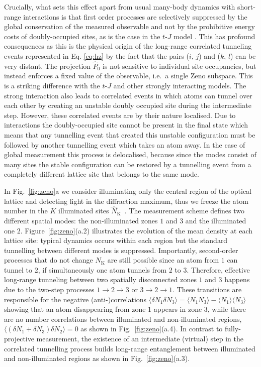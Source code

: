 Crucially, what sets this effect apart from usual many-body dynamics
with short-range interactions is that first order processes are
selectively suppressed by the global conservation of the measured
observable and not by the prohibitive energy costs of doubly-occupied
sites, as is the case in the $t$-$J$ model \cite{auerbach}. This has
profound consequences as this is the physical origin of the long-range
correlated tunneling events represented in Eq. \eqref{eq:hz} by the
fact that the pairs ($i$, $j$) and ($k$, $l$) can be very distant. The
projection $\hat{P}_0$ is not sensitive to individual site
occupancies, but instead enforces a fixed value of the observable,
i.e.~a single Zeno subspace. This is a striking difference with the
$t$-$J$ and other strongly interacting models. The strong interaction
also leads to correlated events in which atoms can tunnel over each
other by creating an unstable doubly occupied site during the
intermediate step. However, these correlated events are by their
nature localised. Due to interactions the doubly-occupied site cannot
be present in the final state which means that any tunnelling event
that created this unstable configuration must be followed by another
tunnelling event which takes an atom away. In the case of global
measurement this process is delocalised, because since the modes
consist of many sites the stable configuration can be restored by a
tunnelling event from a completely different lattice site that belongs
to the same mode.

In Fig.~\ref{fig:zeno}a we consider illuminating only the central
region of the optical lattice and detecting light in the diffraction
maximum, thus we freeze the atom number in the $K$ illuminated sites
$\hat{N}_\text{K}$~\cite{mekhov2009prl,mekhov2009pra}. The measurement
scheme defines two different spatial modes: the non-illuminated zones
$1$ and $3$ and the illuminated one $2$. Figure~\ref{fig:zeno}(a.2)
illustrates the evolution of the mean density at each lattice site:
typical dynamics occurs within each region but the standard tunnelling
between different modes is suppressed. Importantly, second-order
processes that do not change $N_\text{K}$ are still possible since an
atom from $1$ can tunnel to $2$, if simultaneously one atom tunnels
from $2$ to $3$. Therefore, effective long-range tunneling between two
spatially disconnected zones $1$ and $3$ happens due to the two-step
processes $1 \rightarrow 2 \rightarrow 3$ or
$3 \rightarrow 2 \rightarrow 1$. These transitions are responsible for
the negative (anti-)correlations
$\langle \delta N_1 \delta N_3 \rangle = \langle N_1 N_3 \rangle -
\langle N_1 \rangle \langle N_3 \rangle$ showing that an atom
disappearing from zone $1$ appears in zone $3$, while there are no
number correlations between illuminated and non-illuminated regions,
$\langle( \delta N_1 + \delta N_3 ) \delta N_2 \rangle = 0$ as shown
in Fig.~\ref{fig:zeno}(a.4). In contrast to fully-projective
measurement, the existence of an intermediate (virtual) step in the
correlated tunnelling process builds long-range entanglement between
illuminated and non-illuminated regions as shown in
Fig.~\ref{fig:zeno}(a.3).

